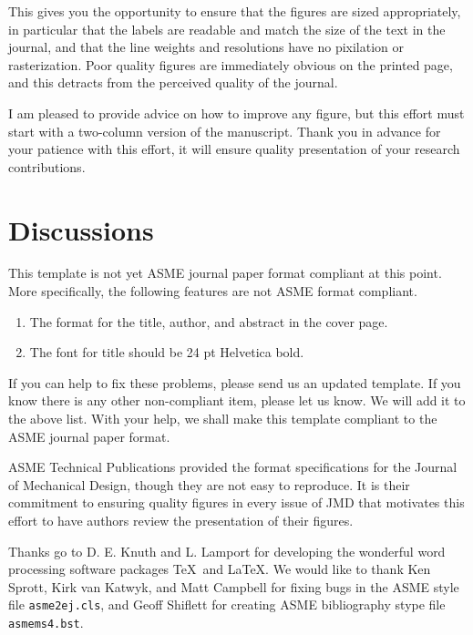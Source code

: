 \documentclass[12pt]{asme2ej}
\begin{document}
    This gives you the opportunity to ensure that the figures are sized appropriately, in particular that the labels are readable and match the size of the text in the journal, and that the line weights and resolutions have no pixilation or rasterization. Poor quality figures are immediately obvious on the printed page, and this detracts from the perceived quality of the journal.

    I am pleased to provide advice on how to improve any figure, but this effort must start with a two-column version of the manuscript. Thank you in advance for your patience with this effort, it will ensure quality presentation of your research contributions.




    \section{Discussions}
    This template is not yet ASME journal paper format compliant at this point.
    More specifically, the following features are not ASME format compliant.
    \begin{enumerate}
        \item
        The format for the title, author, and abstract in the cover page.
        \item
        The font for title should be 24 pt Helvetica bold.
    \end{enumerate}

    \noindent
    If you can help to fix these problems, please send us an updated template.
    If you know there is any other non-compliant item, please let us know.
    We will add it to the above list.
    With your help, we shall make this template
    compliant to the ASME journal paper format.


    \begin{acknowledgment}
        ASME Technical Publications provided the format specifications for the Journal of Mechanical Design, though they are not easy to reproduce. It is their commitment to ensuring quality figures in every issue of JMD that motivates this effort to have authors review the presentation of their figures.

        Thanks go to D. E. Knuth and L. Lamport for developing the wonderful word processing software packages \TeX\ and \LaTeX. We would like to thank Ken Sprott, Kirk van Katwyk, and Matt Campbell for fixing bugs in the ASME style file \verb+asme2ej.cls+, and Geoff Shiflett for creating
        ASME bibliography stype file \verb+asmems4.bst+.
    \end{acknowledgment}
\end{document}

